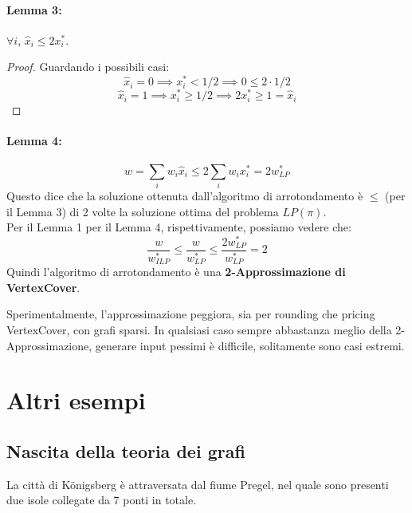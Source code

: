 \documentclass[11pt]{article}
\begin{document}
	\newpage
	
	\paragraph{Lemma 3:} $\forall i$, $\hat{x}_i \leq 2x_i^\ast$.\\
	
	\begin{proof}
		Guardando i possibili casi: 
		$$ \hat{x}_i = 0 \implies x_i^\ast < 1/2 \implies 0 \leq 2 \cdot 1/2 $$
		$$ \hat{x}_i = 1 \implies x_i^\ast \geq 1/2 \implies 2x_i^\ast \geq 1 = \hat{x}_i $$
	\end{proof}
	
	\paragraph{Lemma 4:}
	$$ w = \sum_i w_i \hat{x}_i \leq 2 \sum_i w_i x_i^\ast = 2 w_{LP}^\ast $$
	Questo dice che la soluzione ottenuta dall'algoritmo di arrotondamento è $\leq$ (per il Lemma 3) di 2 volte la soluzione ottima del problema $LP(\pi)$.\\
	
	Per il Lemma 1  per il Lemma 4, rispettivamente, possiamo vedere che:
	$$ \frac{w}{w_{ILP}^\ast} \leq \frac{w}{w_{LP}^\ast} \leq \frac{2 w^\ast_{LP}}{w^\ast_{LP}} = 2$$
	Quindi l'algoritmo di arrotondamento è una \textbf{2-Approssimazione di VertexCover}.\\
	
	
	\vfill
	
	Sperimentalmente, l'approssimazione peggiora, sia per rounding che pricing VertexCover, con grafi sparsi. In qualsiasi caso sempre abbastanza meglio della 2-Approssimazione, generare input pessimi è difficile, solitamente sono casi estremi.\\
	
	\newpage
	
	\section{Altri esempi}
	
	\subsection*{Nascita della teoria dei grafi}
	
	La città di K\"onigsberg è attraversata dal fiume Pregel, nel quale sono presenti due isole collegate da 7 ponti in totale.\\
	
\end{document}
